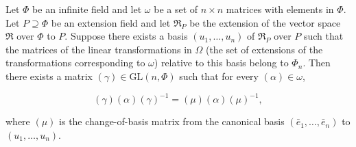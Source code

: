 Let $\Phi$ be an infinite field and let $\omega$ be a set of $n \times n$ matrices with elements in $\Phi$. Let $P \supseteq \Phi$ be an extension field and let $\mathfrak{R}_P$ be the extension of the vector space $\mathfrak{R}$ over $\Phi$ to $P$. Suppose there exists a basis $(u_1, \dots, u_n)$ of $\mathfrak{R}_P$ over $P$ such that the matrices of the linear transformations in $\Omega$ (the set of extensions of the transformations corresponding to $\omega$) relative to this basis belong to $\Phi_n$. Then there exists a matrix $(\gamma) \in \mathrm{GL}(n, \Phi)$ such that for every $(\alpha) \in \omega$,

$$(\gamma)(\alpha)(\gamma)^{-1} = (\mu)(\alpha)(\mu)^{-1},$$

where $(\mu)$ is the change-of-basis matrix from the canonical basis $(\bar{e}_1, \dots, \bar{e}_n)$ to $(u_1, \dots, u_n)$.

